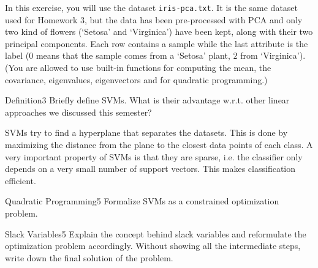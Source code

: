 \newif\ifvimbug
\vimbugfalse

\ifvimbug

\fi

In this exercise, you will use the dataset \texttt{iris-pca.txt}. It is the same dataset used for Homework 3, but the data has been pre-processed with PCA and only two kind of flowers (`Setosa' and `Virginica') have been kept, along with their two principal components. Each row contains a sample while the last attribute is the label ($0$ means that the sample comes from a `Setosa' plant, $2$ from `Virginica').
(You are allowed to use built-in functions for computing the mean, the covariance, eigenvalues, eigenvectors and for quadratic programming.)
\begin{questions}


\begin{question}{Definition}{3}
Briefly define SVMs. What is their advantage w.r.t. other linear approaches we discussed this semester? 


\begin{answer}
SVMs try to find a hyperplane that separates the datasets. This is done by maximizing the distance from the plane to the closest data points of each class. A very important property of SVMs is that they are sparse, i.e. the classifier only depends on a very small number of support vectors. This makes classification efficient.	
\end{answer}
\end{question}


\begin{question}{Quadratic Programming}{5}
Formalize SVMs as a constrained optimization problem.

\begin{answer}\end{answer}
\end{question}


\begin{question}{Slack Variables}{5}
Explain the concept behind slack variables and reformulate the optimization problem accordingly. Without showing all the intermediate steps, write down the final solution of the problem.

\begin{answer}\end{answer}
\end{question}


\end{questions}
